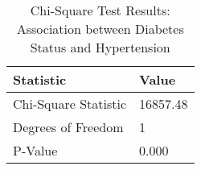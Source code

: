 
\begin{table}[h!]
\centering
\begin{tabular}{|l|l|}
\hline
\textbf{Statistic}       & \textbf{Value} \\ \hline
Chi-Square Statistic        & 16857.48       \\ \hline
Degrees of Freedom          & 1          \\ \hline
P-Value                     & 0.000         \\ \hline
\end{tabular}

\vspace{0.5cm} %

\caption{Chi-Square Test Results: Association between Diabetes Status and Hypertension}
\label{tab:chi_square_results}
\end{table}
